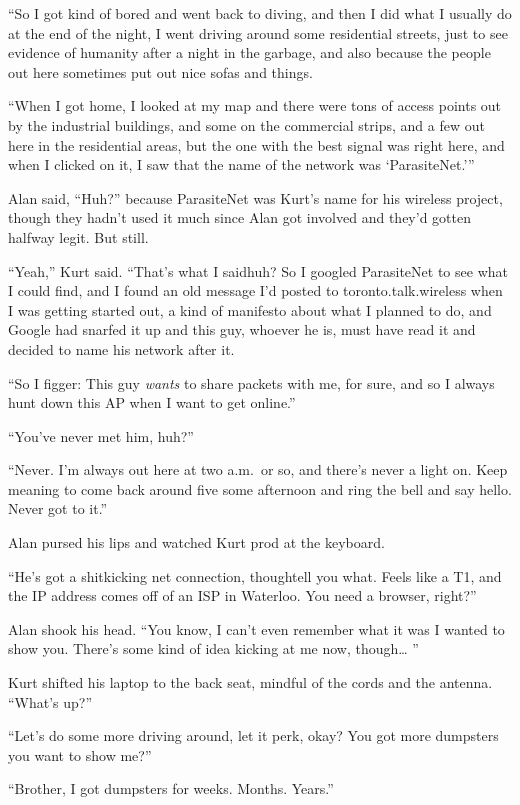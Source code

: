 ``So I got kind of bored and went back to diving, and then I did what
I usually do at the end of the night, I went driving around some
residential streets, just to see evidence of humanity after a night in
the garbage, and also because the people out here sometimes put out
nice sofas and things.

``When I got home, I looked at my map and there were tons of access
points out by the industrial buildings, and some on the commercial
strips, and a few out here in the residential areas, but the one with
the best signal was right here, and when I clicked on it, I saw that
the name of the network was `ParasiteNet.'''

Alan said, ``Huh?'' because ParasiteNet was Kurt's name for his
wireless project, though they hadn't used it much since Alan got
involved and they'd gotten halfway legit.  But still.

``Yeah,'' Kurt said.  ``That's what I said\dash{}huh?  So I googled
ParasiteNet to see what I could find, and I found an old message I'd
posted to toronto.talk.wireless when I was getting started out, a kind
of manifesto about what I planned to do, and Google had snarfed it up
and this guy, whoever he is, must have read it and decided to name his
network after it.

``So I figger:  This guy \textit{wants} to share packets with me, for
sure, and so I always hunt down this AP when I want to get online.''

``You've never met him, huh?''

``Never.  I'm always out here at two a.m.\  or so, and there's never a
light on.  Keep meaning to come back around five some afternoon and
ring the bell and say hello.  Never got to it.''

Alan pursed his lips and watched Kurt prod at the keyboard.

``He's got a shitkicking net connection, though\dash{}tell you what. 
Feels like a T1, and the IP address comes off of an ISP in Waterloo. 
You need a browser, right?''

Alan shook his head.  ``You know, I can't even remember what it was I
wanted to show you.  There's some kind of idea kicking at me now,
though\ldots{}  ''

Kurt shifted his laptop to the back seat, mindful of the cords and the
antenna.  ``What's up?''

``Let's do some more driving around, let it perk, okay?  You got more
dumpsters you want to show me?''

``Brother, I got dumpsters for weeks.  Months.  Years.''

